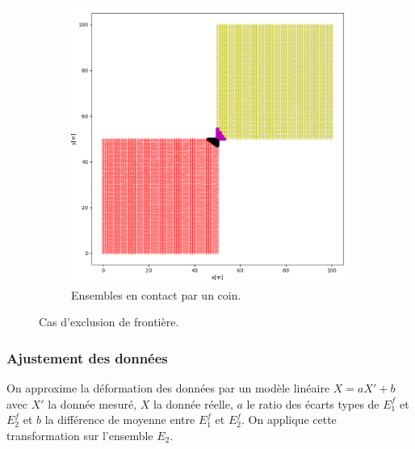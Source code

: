 \documentclass[12pt]{article}
\begin{document}
\begin{figure}[ht!]
\begin{subfigure}[b]{0.475\textwidth}
            \includegraphics[width=\textwidth]{Images/Frontiere_pts_carre1-3.png}
            \caption[]%
            {{\small Ensembles en contact par un coin.}}    
        \end{subfigure}
        \caption{Cas d'exclusion de frontière.}
    \end{figure}

\subsubsection{Ajustement des données}
    
    On approxime la déformation des données par un modèle linéaire $X = aX' + b$ avec $X'$ la donnée mesuré, $X$ la donnée réelle, $a$ le ratio des écarts types de $E_1^f$ et $E_2^f$ et $b$ la différence de moyenne entre $E_1^f$ et $E_2^f$. On applique cette transformation sur l'ensemble $E_2$.
\end{document}
